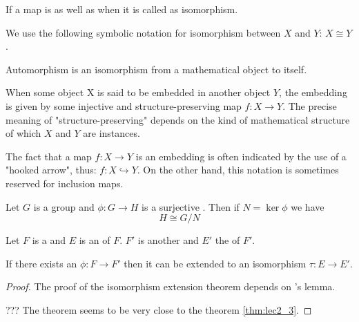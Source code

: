 \begin{appendices}
\begin{definition}[Isomorphism]
  If a map is  as well as
   when it is called as isomorphism.

  We use the following symbolic notation for isomorphism between $X$
  and $Y$: $X \cong Y$.
  \label{def:isomorphism}
\end{definition}

\begin{definition}[Automorphism]
  Automorphism is an isomorphism from a mathematical object to itself.
  \label{def:automorphism}
\end{definition}

\begin{definition}[Embedding]
  When some object X is said to be embedded in another object $Y$, the
  embedding is given by some injective and structure-preserving map
  $f : X \to Y$. The precise meaning of "structure-preserving" depends on
  the kind of mathematical structure of which $X$ and $Y$ are
  instances.
  
  The fact that a map $f : X \to Y$ is an embedding is often indicated
  by the use of a "hooked arrow", thus: $f:X\hookrightarrow Y$. On the
  other hand, this notation is sometimes reserved for inclusion maps.
  \label{def:embedding}
\end{definition}

\begin{theorem}
  Let $G$ is a group and $\phi: G \to H$ is a
  surjective . Then if $N = \ker \phi$ we
  have
  \[
  H \cong G/N
  \]
  \label{thm:firstisomorphism}
\end{theorem}

\begin{theorem}
  Let $F$ is a  and $E$ is an
   of $F$.
  $F'$ is another  and $E'$ the 
   of $F'$.

  If there exists an  $\phi: F \to F'$ then
  it can be extended to an isomorphism $\tau: E \to E'$.

  \begin{proof}
    The proof of the isomorphism extension theorem depends on
    's lemma.

    ??? The theorem seems to be very close to the theorem
    \ref{thm:lec2_3}. 
  \end{proof}
  

\end{theorem}
\end{appendices}
